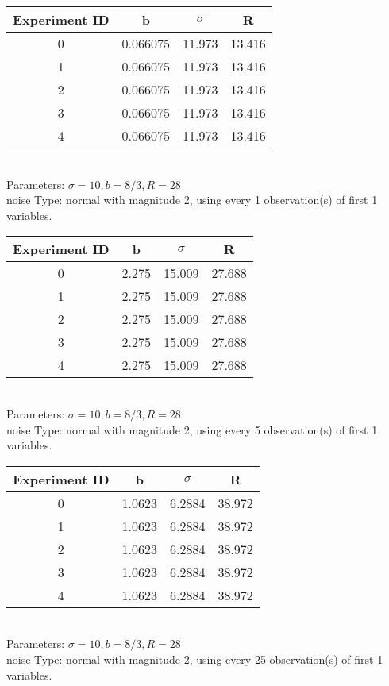 \begin{multicols}{3}
\begin{tabular}{cccc}
\hline Experiment ID & b & $\sigma$ & R \\ \hline 
0 & 0.066075 & 11.973 & 13.416\\ \hline 
 1 & 0.066075 & 11.973 & 13.416\\ \hline 
 2 & 0.066075 & 11.973 & 13.416\\ \hline 
 3 & 0.066075 & 11.973 & 13.416\\ \hline 
 4 & 0.066075 & 11.973 & 13.416\\ \hline 
 \end{tabular}\\
Parameters: $\sigma=10, b=8/3, R=28$\\
noise Type: normal with magnitude 2, using every 1 observation(s) of first 1 variables.\\
\begin{tabular}{cccc}
\hline Experiment ID & b & $\sigma$ & R \\ \hline 
0 & 2.275 & 15.009 & 27.688\\ \hline 
 1 & 2.275 & 15.009 & 27.688\\ \hline 
 2 & 2.275 & 15.009 & 27.688\\ \hline 
 3 & 2.275 & 15.009 & 27.688\\ \hline 
 4 & 2.275 & 15.009 & 27.688\\ \hline 
 \end{tabular}\\
Parameters: $\sigma=10, b=8/3, R=28$\\
noise Type: normal with magnitude 2, using every 5 observation(s) of first 1 variables.\\
\begin{tabular}{cccc}
\hline Experiment ID & b & $\sigma$ & R \\ \hline 
0 & 1.0623 & 6.2884 & 38.972\\ \hline 
 1 & 1.0623 & 6.2884 & 38.972\\ \hline 
 2 & 1.0623 & 6.2884 & 38.972\\ \hline 
 3 & 1.0623 & 6.2884 & 38.972\\ \hline 
 4 & 1.0623 & 6.2884 & 38.972\\ \hline 
 \end{tabular}\\
Parameters: $\sigma=10, b=8/3, R=28$\\
noise Type: normal with magnitude 2, using every 25 observation(s) of first 1 variables.\\
\begin{tabular}{cccc}

\end{tabular}
\end{multicols}
